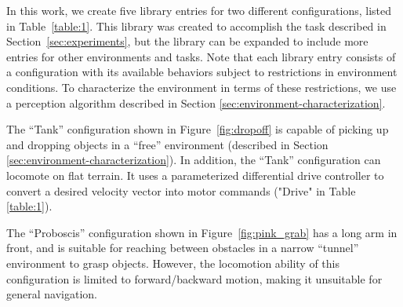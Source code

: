 \documentclass[conference]{IEEEtran}
\begin{document}
In this work, we create five library entries for two different configurations,
listed in Table~\ref{table:1}. This library was created to accomplish the task described in Section~\ref{sec:experiments}, but the library can be expanded to include more entries for other environments and tasks. Note that each library entry consists of a configuration with its available behaviors subject to restrictions in environment conditions. To characterize the environment in terms of these restrictions, we use a perception algorithm described in Section \ref{sec:environment-characterization}.

The ``Tank'' configuration shown in Figure~\ref{fig:dropoff} is capable of picking
up and dropping objects in a ``free'' environment (described in Section \ref{sec:environment-characterization}). In addition, the ``Tank'' configuration can locomote on flat terrain. It uses a parameterized differential drive controller to convert a desired velocity vector into motor commands ("Drive" in Table \ref{table:1}).

The ``Proboscis'' configuration shown in Figure~\ref{fig:pink_grab} has
a long arm in front, and is suitable for reaching between obstacles in a narrow ``tunnel'' environment to grasp objects.
However, the locomotion ability of this configuration is limited to forward/backward
motion, making it unsuitable for general navigation.
\end{document}
